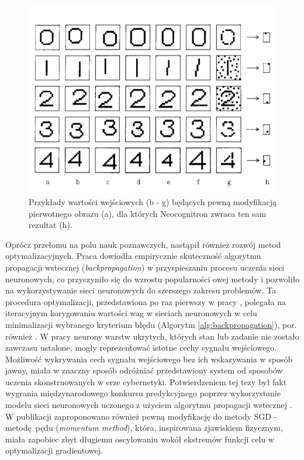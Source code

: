 \documentclass[12pt,a4paper,twoside]{article}
\begin{document}
\begin{figure}[h]
  \centering
\includegraphics[scale=0.5]{../obrazy/fig:distortion.png}
\caption{Przykłady wartości wejściowych (b - g) będących pewną modyfikacją pierwotnego obrazu (a), dla których Neocognitron zwraca ten sam rezultat (h). \label{fig:distortion}}
\end{figure}

Oprócz przełomu na polu nauk poznawczych, nastąpił również rozwój metod optymalizacyjnych. Praca \citet{rumelhart1986} dowiodła empirycznie skuteczność algorytmu propagacji wstecznej (\textit{backpropagation}) w przyspieszaniu procesu uczenia sieci neuronowych, co przyczyniło się do wzrostu popularności owej metody i pozwoliło na wykorzystywanie sieci neuronowych do szerszego zakresu problemów. Ta procedura optymalizacji, przedstawiona po raz pierwszy w pracy \citet{linnainmaa1970}, polegała na iteracyjnym korygowaniu wartości wag w sieciach neuronowych w celu minimalizacji wybranego kryterium błędu (Algorytm \ref{alg:backpropagation}), por. również \citet{hecht1988}. W pracy \citet{rumelhart1986} neurony warstw ukrytych, których stan lub zadanie nie zostało zawczasu ustalone, mogły reprezentować istotne cechy sygnału wejściowego. Możliwość wykrywania cech sygnału wejściowego bez ich wskazywania w sposób jawny, miała w znaczny sposób odróżniać przedstawiony system od sposobów uczenia skonstruowanych w erze cybernetyki. Potwierdzeniem tej tezy był fakt wygrania międzynarodowego konkursu predykcyjnego poprzez wykorzystanie modelu sieci neuronowych uczonego z użyciem algorytmu propagacji wstecznej \citep{wan1993}. W publikacji \citet{rumelhart1986} zaproponowano również pewną modyfikację do metody SGD - metodę pędu (\textit{momentum method}), która, inspirowana zjawiskiem fizycznym, miała zapobiec zbyt długiemu oscylowaniu wokół ekstremów funkcji celu w optymalizacji gradientowej.
\end{document}
